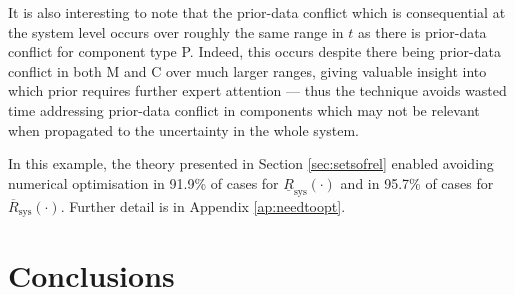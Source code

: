 \documentclass[12pt, a4paper]{elsarticle}
\newcommand{\ul}[1]{\underline{#1}}
\newcommand{\ol}[1]{\overline{#1}}
\newcommand{\Rsys}{R_\text{sys}}
\newcommand{\lRsys}{\ul{R}_\text{sys}}
\newcommand{\uRsys}{\ol{R}_\text{sys}}
\begin{document}
It is also interesting to note that the prior-data conflict 
which is consequential at the system level occurs over 
roughly the same range in $t$ as there is prior-data 
conflict for component type P.
Indeed, this occurs despite there being 
prior-data conflict in both M and C over much larger ranges, 
giving valuable insight into which prior requires further 
expert attention --- thus the technique avoids wasted time 
addressing prior-data conflict in components which may not 
be relevant when propagated to the uncertainty in the whole system.

In this example, the theory presented in Section \ref{sec:setsofrel} enabled avoiding numerical optimisation in 91.9\% of cases for $\lRsys(\cdot)$ and in 95.7\% of cases for $\uRsys(\cdot)$.  Further detail is in Appendix \ref{ap:needtoopt}.



%


\section{Conclusions}
\end{document}
